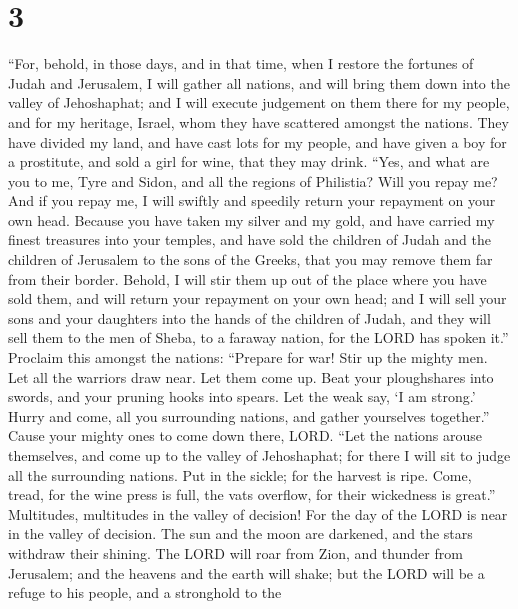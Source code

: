 \hypertarget{section-2}{%
\section{3}\label{section-2}}

 ``For, behold, in those days, and in that time, when I
restore the fortunes of Judah and Jerusalem,  I will gather
all nations, and will bring them down into the valley of Jehoshaphat;
and I will execute judgement on them there for my people, and for my
heritage, Israel, whom they have scattered amongst the nations. They
have divided my land,  and have cast lots for my people, and
have given a boy for a prostitute, and sold a girl for wine, that they
may drink.  ``Yes, and what are you to me, Tyre and Sidon,
and all the regions of Philistia? Will you repay me? And if you repay
me, I will swiftly and speedily return your repayment on your own head.
 Because you have taken my silver and my gold, and have
carried my finest treasures into your temples,  and have
sold the children of Judah and the children of Jerusalem to the sons of
the Greeks, that you may remove them far from their border. 
Behold, I will stir them up out of the place where you have sold them,
and will return your repayment on your own head;  and I will
sell your sons and your daughters into the hands of the children of
Judah, and they will sell them to the men of Sheba, to a faraway nation,
for the LORD has spoken it.''  Proclaim this amongst the
nations: ``Prepare for war! Stir up the mighty men. Let all the warriors
draw near. Let them come up.  Beat your ploughshares into
swords, and your pruning hooks into spears. Let the weak say, `I am
strong.'  Hurry and come, all you surrounding nations, and
gather yourselves together.'' Cause your mighty ones to come down there,
LORD.  ``Let the nations arouse themselves, and come up to
the valley of Jehoshaphat; for there I will sit to judge all the
surrounding nations.  Put in the sickle; for the harvest is
ripe. Come, tread, for the wine press is full, the vats overflow, for
their wickedness is great.''  Multitudes, multitudes in the
valley of decision! For the day of the LORD is near in the valley of
decision.  The sun and the moon are darkened, and the stars
withdraw their shining.  The LORD will roar from Zion, and
thunder from Jerusalem; and the heavens and the earth will shake; but
the LORD will be a refuge to his people, and a stronghold to the
